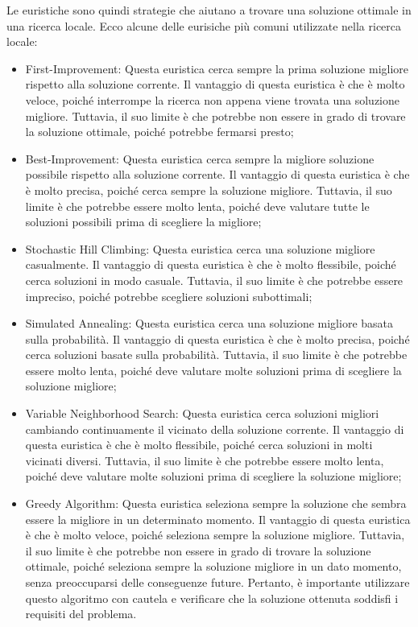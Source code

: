 Le euristiche sono quindi strategie che aiutano a trovare una soluzione ottimale in una ricerca locale. Ecco alcune delle eurisiche più comuni utilizzate nella 
ricerca locale:
\vspace{10pt}
\begin{itemize}
    \item First-Improvement: Questa euristica cerca sempre la prima soluzione migliore rispetto alla soluzione corrente. Il vantaggio di questa euristica è 
    che è molto veloce, poiché interrompe la ricerca non appena viene trovata una soluzione migliore. Tuttavia, il suo limite è che potrebbe non essere in 
    grado di trovare la soluzione ottimale, poiché potrebbe fermarsi presto;
    \vspace{5pt}
    \item Best-Improvement: Questa euristica cerca sempre la migliore soluzione possibile rispetto alla soluzione corrente. Il vantaggio di questa euristica 
    è che è molto precisa, poiché cerca sempre la soluzione migliore. Tuttavia, il suo limite è che potrebbe essere molto lenta, poiché deve valutare 
    tutte le soluzioni possibili prima di scegliere la migliore;
    \vspace{5pt}
    \item Stochastic Hill Climbing: Questa euristica cerca una soluzione migliore casualmente. Il vantaggio di questa euristica è che è molto flessibile, 
    poiché cerca soluzioni in modo casuale. Tuttavia, il suo limite è che potrebbe essere impreciso, poiché potrebbe scegliere soluzioni subottimali;
    \vspace{5pt}
    \item Simulated Annealing: Questa euristica cerca una soluzione migliore basata sulla probabilità. Il vantaggio di questa euristica è che è molto 
    precisa, poiché cerca soluzioni basate sulla probabilità. Tuttavia, il suo limite è che potrebbe essere molto lenta, poiché deve valutare molte 
    soluzioni prima di scegliere la soluzione migliore;
    \vspace{5pt}
    \item Variable Neighborhood Search: Questa euristica cerca soluzioni migliori cambiando continuamente il vicinato della soluzione corrente. Il vantaggio 
    di questa euristica è che è molto flessibile, poiché cerca soluzioni in molti vicinati diversi. Tuttavia, il suo limite è che potrebbe essere molto lenta, 
    poiché deve valutare molte soluzioni prima di scegliere la soluzione migliore;
    \vspace{5pt}
    \item Greedy Algorithm: Questa euristica seleziona sempre la soluzione che sembra essere la migliore in un determinato momento. Il vantaggio di questa 
    euristica è che è molto veloce, poiché seleziona sempre la soluzione migliore. Tuttavia, il suo limite è che potrebbe non essere in grado di trovare la 
    soluzione ottimale, poiché seleziona sempre la soluzione migliore in un dato momento, senza preoccuparsi delle conseguenze future. Pertanto, 
    è importante utilizzare questo algoritmo con cautela e verificare che la soluzione ottenuta soddisfi i requisiti del problema.
\end{itemize}

